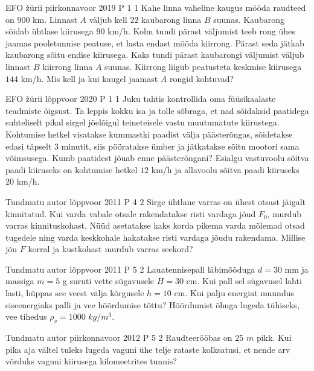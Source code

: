\documentclass[11pt]{article}
\begin{document}
{%
{EFO žürii} %
{piirkonnavoor} %
{2019} %
{P 1} %
{1} %
{
\ifStatement
Kahe linna vaheline kaugus mööda raudteed on $900$ km. Linnast $A$ väljub kell $22$ kaubarong linna $B$ suunas. Kaubarong sõidab ühtlase kiirusega $90$ km/h. Kolm tundi pärast väljumist teeb rong ühes jaamas pooletunnise peatuse, et lasta endast mööda kiirrong. Pärast seda jätkab kaubarong sõitu endise kiirusega. Kaks tundi pärast kaubarongi väljumist väljub linnast $B$ kiirrong linna $A$ suunas. Kiirrong liigub peatusteta keskmise kiirusega $144$ km/h. Mis kell ja kui kaugel jaamast $A$ rongid kohtuvad?  
\fi
}

{EFO žürii} %
{lõppvoor} %
{2020} %
{P 1} %
{1} %
{
\ifStatement
Juku tahtis kontrollida oma füüsikaalaste teadmiste õigsust. Ta leppis kokku isa ja tolle sõbraga, et nad sõidaksid paatidega suhteliselt pikal sirgel jõelõigul teineteisele vastu muutumatute kiirustega. Kohtumise hetkel visatakse kummastki paadist välja päästerõngas, sõidetakse edasi täpselt $3$ minutit, siis pööratakse ümber ja jätkatakse sõitu mootori sama võimsusega. Kumb paatidest jõuab enne päästerõngani? Esialgu vastuvoolu sõitva paadi kiiruseks on kohtumise hetkel $12$ km/h ja allavoolu sõitva paadi kiiruseks $20$ km/h.
\fi
}


{Tundmatu autor} %
{lõppvoor} %
{2011} %
{P 4} %
{2} %
{
\ifStatement
Sirge ühtlane varras on ühest otsast jäigalt kinnitatud. Kui varda vabale otsale rakendatakse risti vardaga jõud $F_0$, murdub varras kinnituskohast. Nüüd asetatakse kaks korda pikema varda mõlemad otsad tugedele ning varda keskkohale hakatakse risti vardaga jõudu rakendama. Millise jõu $F$ korral ja kustkohast murdub varras seekord?
\fi
}


{Tundmatu autor} %
{lõppvoor} %
{2011} %
{P 5} %
{2} %
{
\ifStatement
Lauatennisepall läbimõõduga $d = 30$ mm ja massiga $m = 5$ g suruti vette sügavusele $H = 30$ cm. Kui pall sel sügavusel lahti lasti, hüppas see veest välja kõrgusele $h = 10$ cm. Kui palju energiat muundus siseenergiaks palli ja vee hõõrdumise tõttu? Hõõrdumist õhuga lugeda tühiseks, vee tihedus $\rho_v = 1000$ $kg/m^3$.
\fi
}

{Tundmatu autor} %
{piirkonnavoor} %
{2012} %
{P 5} %
{2} %
{
\ifStatement
Raudteerööbas on $25$ $m$ pikk. Kui pika aja vältel tuleks lugeda vaguni ühe telje rataste kolksatusi, et nende arv võrduks vaguni kiirusega kilomeetrites tunnis?
\fi
}


}
\end{document}
